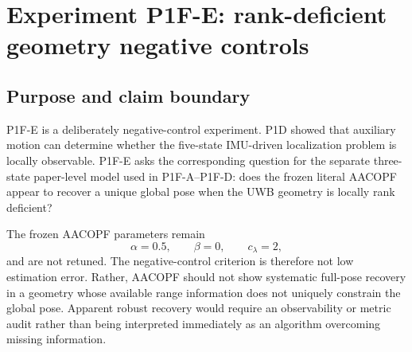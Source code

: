 \section{Experiment P1F-E: rank-deficient geometry negative controls}
\subsection{Purpose and claim boundary}
P1F-E is a deliberately negative-control experiment. P1D showed that auxiliary motion can determine whether the five-state IMU-driven localization problem is locally observable. P1F-E asks the corresponding question for the separate three-state paper-level model used in P1F-A--P1F-D: does the frozen literal AACOPF appear to recover a unique global pose when the UWB geometry is locally rank deficient?

The frozen AACOPF parameters remain
\begin{equation}
    \alpha=0.5,\qquad \beta=0,\qquad c_\lambda=2,
\end{equation}
and are not retuned. The negative-control criterion is therefore not low estimation error. Rather, AACOPF should not show systematic full-pose recovery in a geometry whose available range information does not uniquely constrain the global pose. Apparent robust recovery would require an observability or metric audit rather than being interpreted immediately as an algorithm overcoming missing information.

